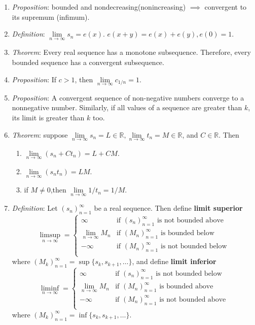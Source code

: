 \documentclass[10pt]{article}
\newcommand{\seqn}[1]{(#1)^\infty_{n=1}}
\newcommand{\real}{\mathbb{R}}
\newcommand{\ntoinf}{\limits_{n\to\infty}}
\newcommand{\limn}[1]{\lim\ntoinf #1}
\begin{document}
\begin{multicols*}{3}
\begin{enumerate}
		\item \emph{Proposition}: bounded and nondecreasing(nonincreasing)
		      $\implies$ convergent to its supremum (infimum).
		\item \emph{Definition}: $\limn s_n=e(x)$. $e(x+y)=e(x)+e(y),e(0)=1$.
		\item \emph{Theorem}: Every real sequence has a monotone subsequence.
		      Therefore, every bounded sequence has a convergent subsequence.
		\item \emph{Proposition}: If $c>1$, then $\limn{c_{1/n}}=1$.
		\item \emph{Proposition}: A convergent sequence of non-negative numbers
		      converge to a nonnegative number. Similarly, if all values of a
		      sequence are greater than $k$, its limit is greater than $k$ too.
		\item \emph{Theorem}: suppose $\limn s_n=L\in\real, \limn
			      t_n=M\in\real$, and $C\in\real$. Then
		      \begin{enumerate}
			      \item $\limn(s_n+Ct_n)=L+CM$.
			      \item $\limn(s_nt_n)=LM$.
			      \item if $M\neq0$,then $\limn1/t_n=1/M$.
		      \end{enumerate}
		\item \emph{Definition}: Let $\seqn{s_n}$ be a real sequence. Then
		      define \textbf{limit superior} \[\limsup\limits_{n\to\infty}=
			      \begin{cases}
				      \infty    & \text{if }\seqn{s_n}\text{ is not bounded above} \\
				      \limn M_n & \text{if }\seqn{M_n}\text{ is bounded below}     \\
				      -\infty   & \text{if }\seqn{M_n}\text{ is not bounded below} \\
			      \end{cases}\]
		      where $\seqn{M_k}=\sup\{s_k, s_{k+1},\dots\}$,
		      and define \textbf{limit inferior}
		      \[\liminf\limits_{n\to\infty}=
			      \begin{cases}
				      \infty    & \text{if }\seqn{s_n}\text{ is not bounded below} \\
				      \limn M_n & \text{if }\seqn{M_n}\text{ is bounded above}     \\
				      -\infty   & \text{if }\seqn{M_n}\text{ is not bounded above} \\
			      \end{cases}\]
		      where $\seqn{M_k}=\inf\{s_k, s_{k+1},\dots\}$.

\end{enumerate}
\end{multicols*}
\end{document}
